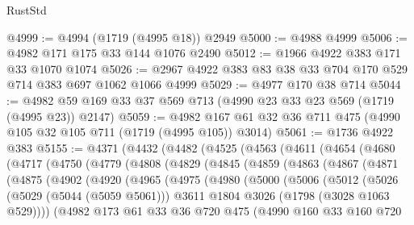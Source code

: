 \begin{lexlean}{RustStd}
\begin{coremodule}
@4999 := @4994 (@1719 (@4995 @18)) @2949
@5000 := @4988 @4999
@5006 := @4982 @171 @175 @33 @144 @1076 @2490
@5012 := @1966 @4922 @383 @171 @33 @1070 @1074
@5026 := @2967 @4922 @383 @83 @38 @33 @704 @170 @529 @714 @383 @697 @1062 @1066 @4999
@5029 := @4977 @170 @38 @714
@5044 := @4982 @59 @169 @33 @37 @569 @713 (@4990 @23 @33 @23 @569 (@1719 (@4995 @23)) @2147)
@5059 := @4982 @167 @61 @32 @36 @711 @475 (@4990 @105 @32 @105 @711 (@1719 (@4995 @105)) @3014)
@5061 := @1736 @4922 @383
@5155 := @4371
    (@4432
      (@4482
        (@4525
          (@4563
            (@4611
              (@4654
                (@4680
                  (@4717
                    (@4750
                      (@4779
                        (@4808
                          (@4829
                            (@4845
                              (@4859
                                (@4863
                                  (@4867
                                    (@4871
                                      (@4875
                                        (@4902
                                          (@4920
                                            (@4965
                                              (@4975
                                                (@4980
                                                  (@5000
                                                    (@5006
                                                      (@5012
                                                        (@5026
                                                          (@5029 (@5044 (@5059 @5061)))
                                                          @3611
                                                          @1804
                                                          @3026
                                                          (@1798 (@3028 @1063 @529))))
                                                      (@4982
                                                        @173
                                                        @61
                                                        @33
                                                        @36
                                                        @720
                                                        @475
                                                        (@4990
                                                          @160
                                                          @33
                                                          @160
                                                          @720

\end{coremodule}
\end{lexlean}

